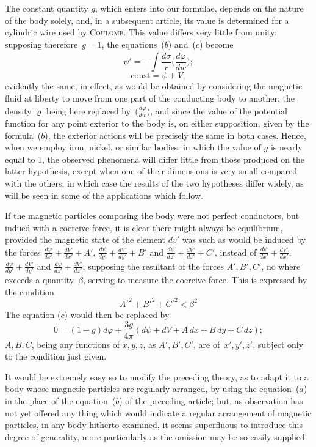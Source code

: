 \documentclass[11pt,notitlepage]{amsart}
\let\Person\textsc
\renewcommand{\rho}{\varrho}
\renewcommand{\phi}{\varphi}
\begin{document}
The constant quantity $g$, which enters into our formulae, depends on
the nature of the body solely, and, in a subsequent article, its value is 
determined for a cylindric wire used by \Person{Coulomb}.
This value differs very little
from unity: supposing therefore~${g=1}$,
the equations~($b$) and~($c$) become
\[
\tag{$b'$.}
\psi'=-\int\frac{d\sigma}{r}\biggl(\frac{\overline{d\phi}}{dw}\biggr);
\]
\[
\tag{$c'$.}
\text{const}=\psi+V,
\]
evidently the same, in effect, as would be obtained by considering the magnetic
fluid at liberty to move from one part of the conducting body to another;
the density $\rho$ being here replaced
by~$\bigl(\frac{\overline{d\phi}}{dw}\bigr)$,
and since the value of the
potential function for any point exterior to the body is, on either supposition,
given by the formula~($b$), the exterior actions will be precisely the same in
both cases. Hence, when we employ iron, nickel, or similar bodies, in which
the value of $g$ is nearly equal to 1, the observed phenomena will differ little
from those produced on the latter hypothesis, except when one of their 
dimensions is very small compared with the others, in which case the results
of the two hypotheses differ widely, as will be seen in some of the 
applications which follow.

If the magnetic particles composing the body were not perfect conductors,
but indued with a coercive force, it is clear there might always be
equilibrium, provided the magnetic state of the element $dv'$
was such as would be
induced by the forces
$\frac{\overline{d\psi}}{dx'}+\frac{dV'}{dx'}+A'$,
$\frac{\overline{d\psi}}{dy'}+\frac{dV'}{dy'}+B'$ and
$\frac{\overline{d\psi}}{dz'}+\frac{dV'}{dz'}+C'$,
instead of
$\frac{\overline{d\psi}}{dx'}+\frac{dV'}{dx'}$,
$\frac{\overline{d\psi}}{dy'}+\frac{dV'}{dy'}$ and
$\frac{\overline{d\psi}}{dz'}+\frac{dV'}{dz'}$;
supposing the resultant of
the forces $A',B',C'$, no where exceeds a quantity~$\beta$, serving to measure
the coercive force. This is expressed by the condition
\[
A'^2+B'^2+C'^2<\beta^2
\]
The equation ($c$) would then be replaced by
\[
0=(1-g)d\phi+\frac{3g}{4\pi}(d\psi+dV+A\,dx+B\,dy+C\,dz);
\]
$A,B,C$, being any functions of $x,y,z$, as $A',B',C'$, are of~$x',y',z'$,
subject only to the condition just given.

It would be extremely easy so to modify the preceding theory, as to
adapt it to a body whose magnetic particles are regularly arranged, by using
the equation~($a$) in the place of the equation~($b$) of the preceding article;
but, as observation has not yet offered any thing which would indicate a
regular arrangement of magnetic particles, in any body hitherto examined, it
seems superfluous to introduce this degree of generality, more particularly as
the omission may be so easily supplied.
\bigskip
\end{document}
